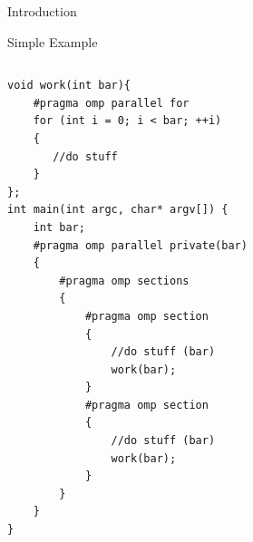 \documentclass[xcolor=dvipsnames]{beamer}
\begin{document}
\begin{section}{Introduction}
\begin{frame}[fragile]{\hskip 0.3cm Simple Example}

\begin{columns}

\begin{column}{5cm}
\begin{lstlisting}[language=CCC]
void work(int bar){
    #pragma omp parallel for
    for (int i = 0; i < bar; ++i)
    {
       //do stuff
    }  
};
int main(int argc, char* argv[]) {
    int bar;
    #pragma omp parallel private(bar)
    {
        #pragma omp sections
        {
            #pragma omp section
            {   
                //do stuff (bar)
                work(bar);
            }
            #pragma omp section
            {
                //do stuff (bar)
                work(bar);
            }
        }
    }
}
\end{lstlisting}

\end{column}

\begin{column}{6.5cm}
\vskip -1cm
\begin{figure}


\end{figure}
\end{column}
\end{columns}
\end{frame}
\end{section}
\end{document}
